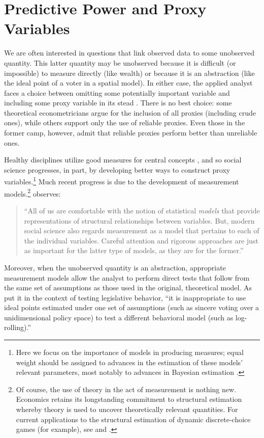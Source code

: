 \section{Predictive Power and Proxy Variables}
We are often interested in questions that link observed data to some unobserved quantity.  This latter quantity may be unobserved because it is difficult (or impossible) to measure directly (like wealth) or because it is an abstraction (like the ideal point of a voter in a spatial model).  In either case, the applied analyst faces a choice between omitting some potentially important variable and including some proxy variable in its stead \citep{stahlecker1993}.  There is no best choice: some theoretical econometricians \citep[e.g.][]{mccallum1972} argue for the inclusion of all proxies (including crude ones), while others \citep[e.g.][]{maddala1977} support only the use of reliable proxies.  Even those in the former camp, however, admit that reliable proxies perform better than unreliable ones.

Healthy disciplines utilize good measures for central concepts \citep{kuhn1977}, and so social science progresses, in part, by developing better ways to construct proxy variables.\footnote{Here we focus on the importance of models in producing measures; equal weight should be assigned to advances in the estimation of these models' relevant parameters, most notably to advances in Bayesian estimation \citep{jackman2001,martin2002,clinton2004,bafumi2005}.}  Much recent progress is due to the development of measurement models.\footnote{Of course, the use of theory in the act of measurement is nothing new.  Economics retains its longstanding commitment to structural estimation whereby theory is used to uncover theoretically relevant quantities.  For current applications to the structural estimation of dynamic discrete-choice games (for example), see \citet{su2012} and \citet{egesdal2013}.} \citet[2]{jacoby2014} observes:
\begin{quote}
  ``All of us are comfortable with the notion of statistical \emph{models} that provide representations of structural relationships between variables.  But, modern social science also regards measurement as a model that pertains to each of the individual variables.  Careful attention and rigorous approaches are just as important for the latter type of models, as they are for the former.''
\end{quote}
Moreover, when the unobserved quantity is an abstraction, appropriate measurement models allow the analyst to perform direct tests that follow from the same set of assumptions as those used in the original, theoretical model.  As \citet[355]{clinton2004} put it in the context of testing legislative behavior, ``it is inappropriate to use ideal points estimated under one set of assumptions (such as sincere voting over a unidimensional policy space) to test a different behavioral model (such as log-rolling).''

